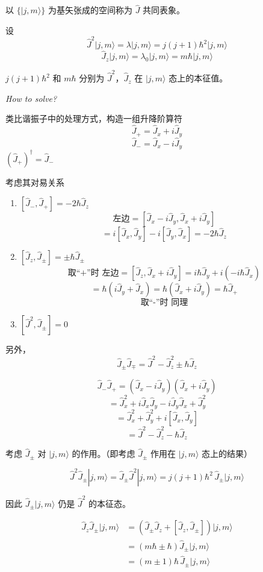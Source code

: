 \documentclass[lang=cn,10pt]{elegantbook}
\begin{document}
以 \(\{|j, m\rangle\}\) 为基矢张成的空间称为 \(\hat{J}\) 共同表象。

设
\[
\hat{J}^2 |j, m\rangle = \lambda |j, m\rangle = j(j+1)\hbar^2 |j, m\rangle
\]
\[
\hat{J}_z |j, m\rangle = \lambda_0 |j, m\rangle = m \hbar |j, m\rangle
\]

\(j(j+1)\hbar^2\) 和 \(m\hbar\) 分别为 \(\hat{J}^2\)，\(\hat{J}_z\) 在 \(|j, m\rangle\) 态上的本征值。

\textit{How to solve?}

类比谐振子中的处理方式，构造一组升降阶算符
\[
\hat{J}_+ = \hat{J}_x + i\hat{J}_y
\]
\[
\hat{J}_- = \hat{J}_x - i\hat{J}_y
\]
$(\hat{J}_+)^\dagger = \hat{J}_-$

考虑其对易关系

\begin{enumerate}
	\item \([\hat{J}_-, \hat{J}_+] = -2\hbar\hat{J}_z\)
	\[
	\text{左边} = [\hat{J}_x - i\hat{J}_y, \hat{J}_x + i\hat{J}_y]
	\]
	\[
	= i[\hat{J}_x,\hat{J}_y] - i[\hat{J}_y,\hat{J}_x] = -2\hbar\hat{J}_z
	\]
	
	\item \([\hat{J}_z, \hat{J}_\pm] = \pm\hbar\hat{J}_\pm\)
	\[
	\text{取“+”时 左边} = [\hat{J}_z, \hat{J}_x + i\hat{J}_y] = i\hbar\hat{J}_y + i(-i\hbar\hat{J}_x)
	\]
	\[
	= \hbar(i\hat{J}_y + \hat{J}_x) = \hbar(\hat{J}_x + i\hat{J}_y) = \hbar\hat{J}_+
	\]
	\[
	\text{取“-”时 同理}
	\]
	
	\item \([\hat{J}^2, \hat{J}_\pm] = 0\)
\end{enumerate}
另外，
\[
\hat{J}_\pm \hat{J}_\mp = \hat{J}^2 - \hat{J}_z^2 \pm \hbar \hat{J}_z
\]

\[
\hat{J}_- \hat{J}_+ = (\hat{J}_x - i\hat{J}_y)(\hat{J}_x + i\hat{J}_y)
\]
\[
= \hat{J}_x^2 + i\hat{J}_x\hat{J}_y - i\hat{J}_y\hat{J}_x + \hat{J}_y^2
\]
\[
= \hat{J}_x^2 + \hat{J}_y^2 + i[\hat{J}_x, \hat{J}_y]
\]
\[
= \hat{J}^2 - \hat{J}_z^2 - \hbar \hat{J}_z
\]

考虑 \(\hat{J}_\pm\) 对 \(|j, m\rangle\) 的作用。（即考虑 \(\hat{J}_\pm\) 作用在 \(|j, m\rangle\) 态上的结果）

\[
\hat{J}^2\hat{J}_\pm |j, m\rangle = \hat{J}_\pm \hat{J}^2 |j, m\rangle = j(j+1)\hbar^2\,\hat{J}_\pm |j, m\rangle
\]

因此 \(\hat{J}_\pm |j,m\rangle\) 仍是 \(\hat{J}^2\) 的本征态。

\begin{align*}
	\hat{J}_z \hat{J}_\pm |j, m\rangle &= \left( \hat{J}_\pm \hat{J}_z + [\hat{J}_z,\hat{J}_\pm] \right) |j, m\rangle \\
	&= \left( m\hbar \pm \hbar \right) \hat{J}_\pm |j, m\rangle \\
	&= (m \pm 1)\hbar\, \hat{J}_\pm |j, m\rangle
\end{align*}
\end{document}
